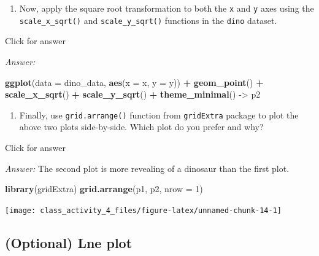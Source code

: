 \documentclass[
]{book}
\newenvironment{Shaded}{\begin{snugshade}}{\end{snugshade}}
\newcommand{\AttributeTok}[1]{\textcolor[rgb]{0.13,0.29,0.53}{#1}}
\newcommand{\DecValTok}[1]{\textcolor[rgb]{0.00,0.00,0.81}{#1}}
\newcommand{\FunctionTok}[1]{\textcolor[rgb]{0.13,0.29,0.53}{\textbf{#1}}}
\newcommand{\NormalTok}[1]{#1}
\newcommand{\OtherTok}[1]{\textcolor[rgb]{0.56,0.35,0.01}{#1}}
\newcommand{\SpecialCharTok}[1]{\textcolor[rgb]{0.81,0.36,0.00}{\textbf{#1}}}
\providecommand{\tightlist}{%
  \setlength{\itemsep}{0pt}\setlength{\parskip}{0pt}}
\begin{document}
\begin{enumerate}
\def\labelenumi{\alph{enumi}.}
\setcounter{enumi}{1}
\tightlist
\item
  Now, apply the square root transformation to both the \texttt{x} and \texttt{y} axes using the \texttt{scale\_x\_sqrt()} and \texttt{scale\_y\_sqrt()} functions in the \texttt{dino} dataset.
\end{enumerate}

Click for answer

\emph{Answer:}

\begin{Shaded}
\begin{Highlighting}[]
\FunctionTok{ggplot}\NormalTok{(}\AttributeTok{data =}\NormalTok{ dino\_data, }\FunctionTok{aes}\NormalTok{(}\AttributeTok{x =}\NormalTok{ x, }\AttributeTok{y =}\NormalTok{ y)) }\SpecialCharTok{+}
  \FunctionTok{geom\_point}\NormalTok{() }\SpecialCharTok{+}
  \FunctionTok{scale\_x\_sqrt}\NormalTok{() }\SpecialCharTok{+}
  \FunctionTok{scale\_y\_sqrt}\NormalTok{() }\SpecialCharTok{+}
  \FunctionTok{theme\_minimal}\NormalTok{() }\OtherTok{{-}\textgreater{}}\NormalTok{ p2}
\end{Highlighting}
\end{Shaded}

\begin{enumerate}
\def\labelenumi{\alph{enumi}.}
\setcounter{enumi}{2}
\tightlist
\item
  Finally, use \texttt{grid.arrange()} function from \texttt{gridExtra} package to plot the above two plots side-by-side. Which plot do you prefer and why?
\end{enumerate}

Click for answer

\emph{Answer:} The second plot is more revealing of a dinosaur than the first plot.

\begin{Shaded}
\begin{Highlighting}[]
\FunctionTok{library}\NormalTok{(gridExtra)}
\FunctionTok{grid.arrange}\NormalTok{(p1, p2, }\AttributeTok{nrow =} \DecValTok{1}\NormalTok{)}
\end{Highlighting}
\end{Shaded}

\texttt{[image: class\_activity\_4\_files/figure-latex/unnamed-chunk-14-1]}

\hypertarget{optional-lne-plot}{%
\subsection{(Optional) Lne plot}\label{optional-lne-plot}}
\end{document}
